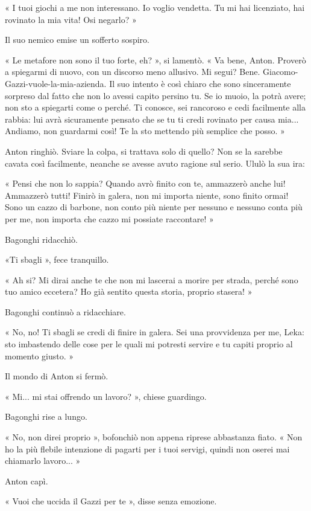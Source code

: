 « I tuoi giochi a me non interessano. Io voglio vendetta. Tu mi hai licenziato, hai rovinato la mia vita! Osi negarlo? »

Il suo nemico emise un sofferto sospiro.

« Le metafore non sono il tuo forte, eh? », si lamentò. « Va bene, Anton. Proverò a spiegarmi di nuovo, con un discorso meno allusivo. Mi segui? Bene. Giacomo-Gazzi-vuole-la-mia-azienda. Il suo intento è così chiaro che sono sinceramente sorpreso dal fatto che non lo avessi capito persino tu. Se io muoio, la potrà avere; non sto a spiegarti come o perché. Ti conosce, sei rancoroso e cedi facilmente alla rabbia: lui avrà sicuramente pensato che se tu ti credi rovinato per causa mia... Andiamo, non guardarmi così! Te la sto mettendo più semplice che posso. »

Anton ringhiò. Sviare la colpa, si trattava solo di quello? Non se la sarebbe cavata così facilmente, neanche se avesse avuto ragione sul serio. Ululò la sua ira:

« Pensi che non lo sappia? Quando avrò finito con te, ammazzerò anche lui! Ammazzerò tutti! Finirò in galera, non mi importa niente, sono finito ormai! Sono un cazzo di barbone, non conto più niente per nessuno e nessuno conta più per me, non importa che cazzo mi possiate raccontare! »

Bagonghi ridacchiò.

«Ti sbagli », fece tranquillo.

« Ah si? Mi dirai anche te che non mi lascerai a morire per strada, perché sono tuo amico eccetera? Ho già sentito questa storia, proprio stasera! »

Bagonghi continuò a ridacchiare.

« No, no! Ti sbagli se credi di finire in galera. Sei una provvidenza per me, Leka: sto imbastendo delle cose per le quali mi potresti servire e tu capiti proprio al momento giusto. »

Il mondo di Anton si fermò.

« Mi... mi stai offrendo un lavoro? », chiese guardingo.

Bagonghi rise a lungo.

« No, non direi proprio », bofonchiò non appena riprese abbastanza fiato. « Non ho la più flebile intenzione di pagarti per i tuoi servigi, quindi non oserei mai chiamarlo lavoro... »

Anton capì.

« Vuoi che uccida il Gazzi per te », disse senza emozione.

